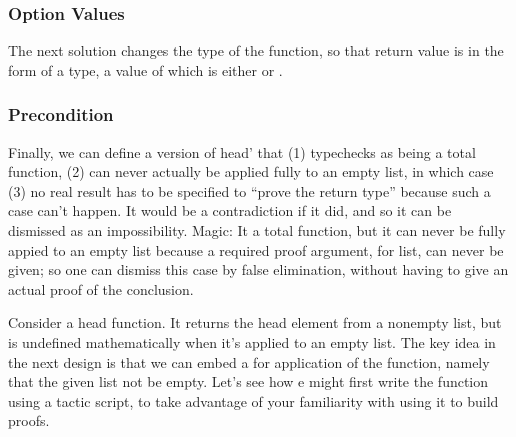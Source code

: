 \documentclass[letterpaper,10pt,english]{sphinxmanual}
\begin{document}
\subsubsection{Option Values}
\label{\detokenize{A_03_Recursive_Types:option-values}}
\sphinxAtStartPar
The next solution changes the type of the function,
so that return value is in the form of a 
type, a value of which is either  or .

\begin{sphinxVerbatim}[commandchars=\\\{\}]
           
    
     

  \PYG{o}{[}\PYG{o}{]}
   \PYG{o}{[}\PYG{o}{]}
\end{sphinxVerbatim}


\subsubsection{Precondition}
\label{\detokenize{A_03_Recursive_Types:precondition}}
\sphinxAtStartPar
Finally, we can define a version of head’ that (1) typechecks
as being a total function, (2) can never actually be applied
fully to an empty list, in which case (3) no real result has
to be specified to “prove the return type” because such a case
can’t happen. It would be a contradiction if it did, and so it
can be dismissed as an impossibility. Magic: It  a total
function, but it can never be fully appied to an empty list
because a required proof argument, for  list, can never
be given; so one can dismiss this case by false elimination,
without having to give an actual proof of the conclusion.

\sphinxAtStartPar
Consider a head function. It returns the head element from
a non\sphinxhyphen{}empty list, but is undefined mathematically when it’s
applied to an empty list. The key idea in the next design
is that we can embed a  for application of
the function, namely that the given list not be empty. Let’s
see how e might first write the function using a tactic
script, to take advantage of your familiarity with using
it to build proofs.
\end{document}
